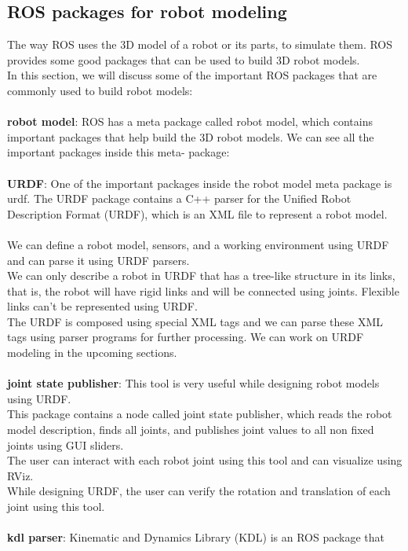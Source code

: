 \documentclass[a4paper]{article}
\begin{document}
\subsection{ROS packages for robot modeling}
The way ROS uses the 3D model of a robot or its parts, to simulate them. ROS provides some good packages that can be used to build 3D robot models.\\ In this
section, we will discuss some of the important ROS packages that are commonly used to
build robot models:
\\\\\textbf{robot model}: ROS has a meta package called robot model, which contains important 
packages that 
help build the 3D robot models. We can see all the important packages inside this meta-
package:
\\\\\textbf{URDF}: One of the important packages inside the robot model meta package is urdf. The 
URDF package contains a C++ parser for the Unified Robot Description Format (URDF),
which is an XML file to represent a robot model.
\\\\ We can define a robot model, sensors, and a working environment using URDF and 
can parse it using URDF parsers.
\\We can only describe a robot in URDF that has a tree-like 
structure in its links, that is, the robot will have rigid links and will be connected 
using joints. Flexible links can't be represented using URDF.
\\ The URDF is composed using special XML tags and we can parse these XML tags using 
parser programs for further processing. We can work on URDF modeling in the upcoming 
sections.
\\\\\textbf{joint state publisher}: This tool is very useful while designing robot 
models using URDF.
\\This package contains a node called joint state publisher, which reads the robot 
model description, finds all joints, and publishes joint values to all non fixed 
joints 
using GUI sliders. 
\\The user can interact with each robot joint using this tool and can visualize using 
RViz.
\\While designing URDF, the user can verify the rotation and translation of each 
joint using this tool. 
\\\\\textbf{kdl parser}: Kinematic and Dynamics Library (KDL) is an ROS package that 
\end{document}
